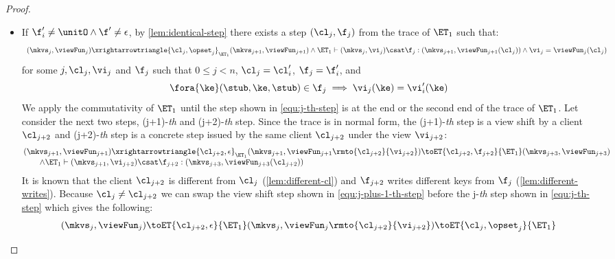 \begin{proof}
\begin{itemize}
\begin{itemize}
    \item If \( \f'_i \neq \unitO  \land \f' \neq \epsilon \), by \cref{lem:identical-step} there exists a step \( (\cl_j, \f_j) \) from the trace of \( \ET_1 \) such that:
\begin{equation}
    \label{equ:j-th-step}
    \begin{array}{l}
    (\mkvs_{j}, \viewFun_{j}) \xrightarrowtriangle{\cl_{j}, \opset_{j}}_{\ET_1} (\mkvs_{j + 1}, \viewFun_{j + 1}) 
    \land \ET_1 \vdash (\mkvs_{j}, \vi_j) \csat \f_j : (\mkvs_{j+1},\viewFun_{j + 1}(\cl_{j}) ) \land \vi_j = \viewFun_{j}(\cl_j)
\end{array}
\end{equation}
for some \( j, \cl_j, \vi_j\) and \( \f_j \) such that \( 0 \leq  j < n \), \( \cl_j = \cl'_{i}\), \( \f_j = \f'_{i}\), and
\[ 
    \fora{\ke} (\stub, \ke, \stub ) \in \f_j \implies \vi_j(\ke) = \vi'_{i}(\ke)
\]
We apply the commutativity of \( \ET_1 \) until the step shown in \cref{equ:j-th-step} is at the end or the second end of the trace of \( \ET_1 \).
Let consider the next two steps, (j+1)-\emph{th} and (j+2)-\emph{th} step.
Since the trace is in normal form, the (j+1)-\emph{th} step is a view shift by a client \( \cl_{j+2} \) and (j+2)-\emph{th} step is a concrete step issued by the same client \( \cl_{j+2} \) under the view \( \vi_{j+2} \):
\begin{equation}
    \label{equ:j-plus-1-th-step}
    \begin{array}{@{}l@{}}
        (\mkvs_{j+1}, \viewFun_{j+1}) \xrightarrowtriangle{\cl_{j+2}, \epsilon}_{\ET_1}
        (\mkvs_{j+1}, \viewFun_{j+1}\rmto{\cl_{j+2}}{\vi_{j+2}}) \toET{\cl_{j+2}, \f_{j+2}}{\ET_1} (\mkvs_{j+3}, \viewFun_{j+3}) \\
        \qquad \land \ET_1 \vdash (\mkvs_{j+1},\vi_{j+2}) \csat \f_{j+2} : (\mkvs_{j+3},\viewFun_{j+3}(\cl_{j+2}) )
    \end{array}
\end{equation}
It is known that the client  \( \cl_{j+2} \) is different from \( \cl_j \) (\cref{lem:different-cl}) and \( \f_{j+2} \) writes different keys from \( \f_j\) (\cref{lem:different-writes}). 
Because \( \cl_j \neq \cl_{j+2} \) we can swap the view shift step shown in \cref{equ:j-plus-1-th-step} before the j-\emph{th} step shown in \cref{equ:j-th-step} which gives the following:
\begin{equation}
    \label{equ:swap-the-view-shift-et1}
    \begin{array}{@{}l@{}}
    (\mkvs_{j}, \viewFun_{j}) \toET{\cl_{j+2}, \epsilon}{\ET_1} (\mkvs_{j}, \viewFun_{j}\rmto{\cl_{j+2}}{\vi_{j+2}}) \toET{\cl_{j}, \opset_{j}}{\ET_1} \\

\end{array}
\end{equation}
\end{itemize}
\end{itemize}
\end{proof}

